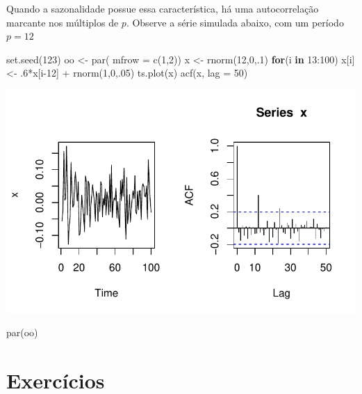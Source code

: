 \documentclass[
  letterpaper,
  DIV=11,
  numbers=noendperiod]{scrreprt}
\newenvironment{Shaded}{\begin{snugshade}}{\end{snugshade}}
\newcommand{\AttributeTok}[1]{\textcolor[rgb]{0.40,0.45,0.13}{#1}}
\newcommand{\ControlFlowTok}[1]{\textcolor[rgb]{0.00,0.23,0.31}{\textbf{#1}}}
\newcommand{\DecValTok}[1]{\textcolor[rgb]{0.68,0.00,0.00}{#1}}
\newcommand{\FunctionTok}[1]{\textcolor[rgb]{0.28,0.35,0.67}{#1}}
\newcommand{\NormalTok}[1]{\textcolor[rgb]{0.00,0.23,0.31}{#1}}
\newcommand{\OtherTok}[1]{\textcolor[rgb]{0.00,0.23,0.31}{#1}}
\newcommand{\SpecialCharTok}[1]{\textcolor[rgb]{0.37,0.37,0.37}{#1}}
\begin{document}
Quando a sazonalidade possue essa característica, há uma autocorrelação
marcante nos múltiplos de \(p\). Observe a série simulada abaixo, com um
período \(p=12\)

\begin{Shaded}
\begin{Highlighting}[]
\FunctionTok{set.seed}\NormalTok{(}\DecValTok{123}\NormalTok{)}
\NormalTok{oo }\OtherTok{\textless{}{-}} \FunctionTok{par}\NormalTok{( }\AttributeTok{mfrow =} \FunctionTok{c}\NormalTok{(}\DecValTok{1}\NormalTok{,}\DecValTok{2}\NormalTok{))}
\NormalTok{x }\OtherTok{\textless{}{-}} \FunctionTok{rnorm}\NormalTok{(}\DecValTok{12}\NormalTok{,}\DecValTok{0}\NormalTok{,.}\DecValTok{1}\NormalTok{)}
\ControlFlowTok{for}\NormalTok{(i }\ControlFlowTok{in} \DecValTok{13}\SpecialCharTok{:}\DecValTok{100}\NormalTok{) x[i] }\OtherTok{\textless{}{-}}\NormalTok{ .}\DecValTok{6}\SpecialCharTok{*}\NormalTok{x[i}\DecValTok{{-}12}\NormalTok{] }\SpecialCharTok{+} \FunctionTok{rnorm}\NormalTok{(}\DecValTok{1}\NormalTok{,}\DecValTok{0}\NormalTok{,.}\DecValTok{05}\NormalTok{)}
\FunctionTok{ts.plot}\NormalTok{(x)}
\FunctionTok{acf}\NormalTok{(x, }\AttributeTok{lag =} \DecValTok{50}\NormalTok{)}
\end{Highlighting}
\end{Shaded}

\includegraphics{sinal_files/figure-pdf/unnamed-chunk-11-1.pdf}

\begin{Shaded}
\begin{Highlighting}[]
\FunctionTok{par}\NormalTok{(oo)}
\end{Highlighting}
\end{Shaded}

\section{Exercícios}\label{exercuxedcios}
\end{document}
